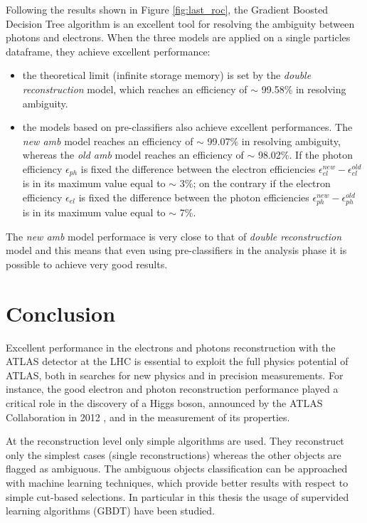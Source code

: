 \documentclass[a4paper, oneside, 11pt, openright]{book}
\begin{document}
			Following the results shown in Figure \ref{fig:last_roc}, the Gradient Boosted Decision Tree algorithm is an excellent tool for resolving the ambiguity between photons and electrons. When the three models are applied on a single particles dataframe, they achieve excellent performance: 
			\begin{itemize}
				\item the theoretical limit (infinite storage memory) is set by the \textit{double reconstruction} model, which reaches an efficiency of $\sim$ 99.58\% in resolving ambiguity.
				\item the models based on pre-classifiers also achieve excellent performances. The \textit{new amb} model reaches an efficiency of $\sim$ 99.07\% in resolving ambiguity, whereas the \textit{old amb} model reaches an efficiency of $\sim$ 98.02\%. If the photon efficiency $\epsilon_{ph}$ is fixed the difference between the electron efficiencies $\epsilon_{el}^{new} - \epsilon_{el}^{old}$ is in its maximum value equal to $\sim$ 3\%; on the contrary if the electron efficiency $\epsilon_{el}$ is fixed the difference between the photon efficiencies $\epsilon_{ph}^{new} - \epsilon_{ph}^{old}$ is in its maximum value equal to $\sim$ 7\%.
			\end{itemize}
		  
		The \textit{new amb} model performace is very close to that of \textit{double reconstruction} model and this means that even using pre-classifiers in the analysis phase it is possible to achieve very good results.
		
	\chapter{Conclusion}
		Excellent performance in the electrons and photons reconstruction with the ATLAS detector at the LHC is essential to exploit the full physics potential of ATLAS, both in searches for new physics and in precision measurements. For instance, the good electron and photon reconstruction performance played a critical role in the discovery of a Higgs boson, announced by the ATLAS Collaboration in 2012 \cite{Higgs}, and in the measurement of its properties.
		
		At the reconstruction level only simple algorithms are used. They reconstruct only the simplest cases (single reconstructions) whereas the other objects are flagged as ambiguous. The ambiguous objects classification can be approached with machine learning techniques, which provide better results with respect to simple cut-based selections. In particular in this thesis the usage of supervided learning algorithms (GBDT) have been studied.
		
\end{document}
